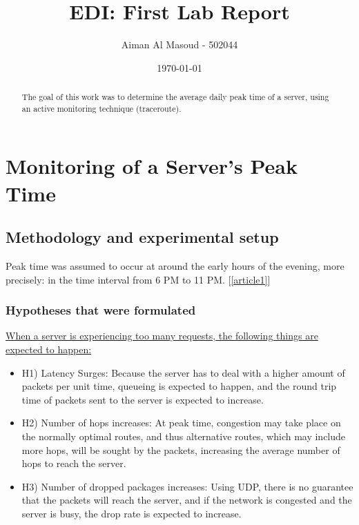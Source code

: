 \documentclass[a4paper,10pt]{article}
\begin{document}
\title{EDI: First Lab Report}
\author{Aiman Al Masoud - 502044}
\date{\today}

\maketitle

\begin{abstract}
The goal of this work was to determine the average daily peak time of a server, using an active monitoring technique (traceroute).
\end{abstract}

\clearpage

\setcounter{page}{1}

\section{Monitoring of a Server's Peak Time}


\subsection{Methodology and experimental setup}


Peak time was assumed to occur at around the early hours of the evening, more precisely: in the time interval from 6 PM to 11 PM. [\ref{article1}]


\maketitle
\subsubsection{Hypotheses that were formulated}



\underline{When a server is experiencing too many requests, the following things are expected to happen: }


\begin{itemize}

\item H1) Latency Surges: Because the server has to deal with a higher amount of packets per unit time, queueing is expected to happen, and the round trip time of packets sent to the server is expected to increase.

\item H2) Number of hops increases: At peak time, congestion may take place on the normally optimal routes, and thus alternative routes, which may include more hops, will be sought by the packets, increasing the average number of hops to reach the server.

\item H3) Number of dropped packages increases: Using UDP, there is no guarantee that the packets will reach the server, and if the network is congested and the server is busy, the drop rate is expected to increase.

\end{itemize}
\end{document}
